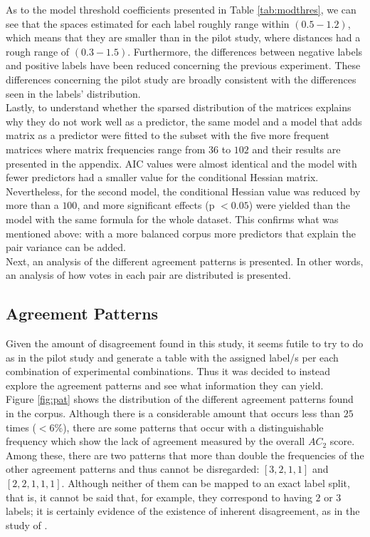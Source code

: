 As to the model threshold coefficients presented in Table \ref{tab:modthres}, we can see that the spaces estimated for each label roughly range within $(0.5-1.2)$, which means that they are smaller than in the pilot study, where distances had a rough range of $(0.3-1.5)$. Furthermore, the differences between negative labels and positive labels have been reduced concerning the previous experiment. These differences concerning the pilot study are broadly consistent with the differences seen in the labels' distribution.\\

Lastly, to understand whether the sparsed distribution of the matrices explains why they do not work well as a predictor, the same model and a model that adds matrix as a predictor were fitted to the subset with the five more frequent matrices where matrix frequencies range from $36$ to $102$ and their results are presented in the appendix. AIC values were almost identical and the model with fewer predictors had a smaller value for the conditional Hessian matrix. Nevertheless, for the second model, the conditional Hessian value was reduced by more than a $100$, and more significant effects (p $<0.05$) were yielded than the model with the same formula for the whole dataset. This confirms what was mentioned above: with a more balanced corpus more predictors that explain the pair variance can be added.\\

Next, an analysis of the different agreement patterns is presented. In other words, an analysis of how votes in each pair are distributed is presented.\\

\subsection{Agreement Patterns}\label{subsect:agrepat}

Given the amount of disagreement found in this study, it seems futile to try to do as in the pilot study and generate a table with the assigned label/s per each combination of experimental combinations. Thus it was decided to instead explore the agreement patterns and see what information they can yield.\\

Figure \ref{fig:pat} shows the distribution of the different agreement patterns found in the corpus. Although there is a considerable amount that occurs less than $25$ times ($<6\%$), there are some patterns that occur with a distinguishable frequency which show the lack of agreement measured by the overall $AC_2$ score. Among these, there are two patterns that more than double the frequencies of the other agreement patterns and thus cannot be disregarded: $[3,2,1,1]$ and $[2,2,1,1,1]$. Although neither of them can be mapped to an exact label split, that is, it cannot be said that, for example, they correspond to having $2$ or $3$ labels; it is certainly evidence of the existence of inherent disagreement, as in the study of \citet{pavlick2019inherent}.\\


